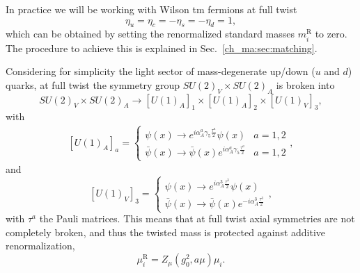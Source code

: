 In practice we will be working with Wilson tm fermions at full twist
\begin{equation}
\label{ch_foundation:eq:mte}
\eta_u=\eta_c=-\eta_s=-\eta_d=1,
\end{equation}
which can be obtained by setting the renormalized standard masses $m_i^{\textrm{R}}$ to zero. The procedure to achieve this is explained in Sec.~\ref{ch_ma:sec:matching}.

Considering for simplicity the light sector of mass-degenerate up/down ($u$ and $d$) quarks, at full twist the symmetry group $SU(2)_V\times SU(2)_A$ is broken into
\begin{equation}
SU(2)_V\times SU(2)_A\rightarrow[U(1)_A]_1\times[U(1)_A]_2\times[U(1)_V]_3,
\end{equation}
with 
\begin{align}
\left[U(1)_A\right]_a=\left\{\begin{matrix}
\psi(x)\rightarrow e^{i\alpha_A^a\gamma_5\frac{\tau^a}{2}}\psi(x) & a=1,2 \\ 
\bar{\psi}(x)\rightarrow \bar{\psi}(x)e^{i\alpha_A^a\gamma_5\frac{\tau^a}{2}} & a=1,2
\end{matrix}\right.,
\end{align}
and
\begin{equation}
\left[U(1)_V\right]_3=\left\{\begin{matrix}
\psi(x)\rightarrow e^{i\alpha_A^3\frac{\tau^3}{2}}\psi(x) \\ 
\bar{\psi}(x)\rightarrow \bar{\psi}(x)e^{-i\alpha_A^3\frac{\tau^3}{2}}
\end{matrix}\right.,
\end{equation}
with $\tau^{a}$ the Pauli matrices. This means that at full twist axial symmetries are not completely broken, and thus the twisted mass is protected against additive renormalization,
\begin{equation}
\label{ch_foundation:eq:muR}
\mu_i^{\textrm{R}}=Z_{\mu}(g_0^2,a\mu)\mu_i.
\end{equation}

